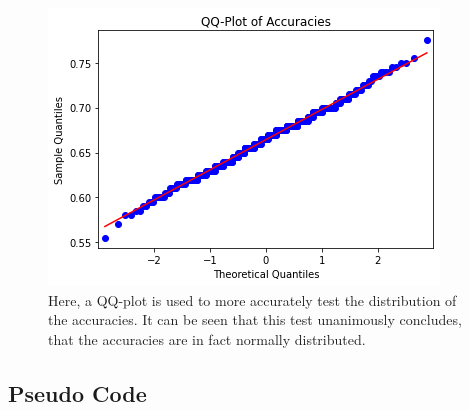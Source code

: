 \documentclass[11pt, fleqn, titlepage]{article}
\begin{document}
	\begin{figure}[H]
		\centering
		\includegraphics[width=0.5\linewidth]{imgs/qqplot_accuracies}
		\caption{Here, a QQ-plot is used to more accurately test the  distribution of the accuracies. It can be seen that this test unanimously concludes, that the accuracies are in fact normally distributed.}
		\label{fig:qqplotaccuracies}
	\end{figure}
	
	
	\subsection{Pseudo Code}\label{pseudo_code}
\end{document}

